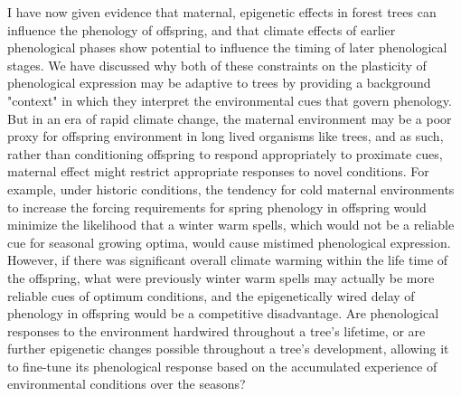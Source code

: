 \documentclass{article}\usepackage[]{graphicx}\usepackage[]{color}
\begin{document}
\par I have now given evidence that maternal, epigenetic effects in forest trees can influence the phenology of offspring, and that climate effects of earlier phenological phases show potential to influence the timing of later phenological stages. We have discussed why both of these constraints on the plasticity of phenological expression may be adaptive to trees by providing a background "context" in which they interpret the environmental cues that govern phenology. But in an era of rapid climate change, the maternal environment may be a poor proxy for offspring environment in long lived organisms like trees, and as such, rather than conditioning offspring to respond appropriately to proximate cues, maternal effect might restrict appropriate responses to novel conditions. For example, under historic conditions, the tendency for cold maternal environments to increase the forcing requirements for spring phenology in offspring would minimize the likelihood that a winter warm spells, which would not be a reliable cue for seasonal growing optima, would cause mistimed phenological expression. However, if there was significant overall climate warming within the life time of the offspring, what were previously winter warm spells may actually be more reliable cues of optimum conditions, and the epigenetically wired delay of phenology in offspring would be a competitive disadvantage. Are phenological responses to the environment hardwired throughout a tree's lifetime, or are further epigenetic changes possible throughout a tree's development, allowing it to fine-tune its phenological response based on the accumulated experience of environmental conditions over the seasons?  
\end{document}

